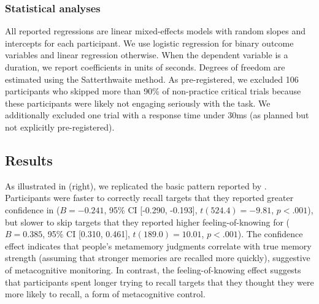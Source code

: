 
\subsubsection{Statistical analyses}

All reported regressions are linear mixed-effects models with random slopes and intercepts for each participant. We use logistic regression for binary outcome variables and linear regression otherwise. When the dependent variable is a duration, we report coefficients in units of seconds. Degrees of freedom are estimated using the Satterthwaite method. As pre-registered, we excluded 106 participants who skipped more than 90\% of non-practice critical trials because these participants were likely not engaging seriously with the task. We additionally excluded one trial with a response time under 30ms (as planned but not explicitly pre-registered).

\subsection{Results}

As illustrated in  (right), we replicated the basic pattern reported by \citet{costermans1992confidence}. Participants were faster to correctly recall targets that they reported greater confidence in ($B = -0.241$, 95\% CI [-0.290, -0.193], $t(524.4)=-9.81$, $p < .001$), but slower to skip targets that they reported higher feeling-of-knowing for ($B = 0.385$, 95\% CI [0.310, 0.461], $t(189.0)=10.01$, $p < .001$). The confidence effect indicates that people's metamemory judgments correlate with true memory strength (assuming that stronger memories are recalled more quickly), suggestive of metacognitive monitoring. In contrast, the feeling-of-knowing effect suggests that participants spent longer trying to recall targets that they thought they were more likely to recall, a form of metacognitive control.

